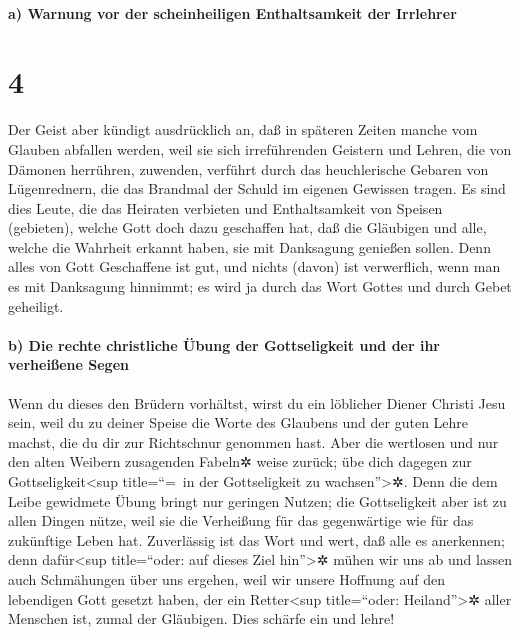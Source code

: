 \hypertarget{a-warnung-vor-der-scheinheiligen-enthaltsamkeit-der-irrlehrer}{%
\paragraph{a) Warnung vor der scheinheiligen Enthaltsamkeit der
Irrlehrer}\label{a-warnung-vor-der-scheinheiligen-enthaltsamkeit-der-irrlehrer}}

\hypertarget{section-3}{%
\section{4}\label{section-3}}

 Der Geist aber kündigt ausdrücklich an, daß in späteren
Zeiten manche vom Glauben abfallen werden, weil sie sich irreführenden
Geistern und Lehren, die von Dämonen herrühren, zuwenden, 
verführt durch das heuchlerische Gebaren von Lügenrednern, die das
Brandmal der Schuld im eigenen Gewissen tragen.  Es sind
dies Leute, die das Heiraten verbieten und Enthaltsamkeit von Speisen
(gebieten), welche Gott doch dazu geschaffen hat, daß die Gläubigen und
alle, welche die Wahrheit erkannt haben, sie mit Danksagung genießen
sollen.  Denn alles von Gott Geschaffene ist gut, und
nichts (davon) ist verwerflich, wenn man es mit Danksagung hinnimmt;
 es wird ja durch das Wort Gottes und durch Gebet
geheiligt.

\hypertarget{b-die-rechte-christliche-uxfcbung-der-gottseligkeit-und-der-ihr-verheiuxdfene-segen}{%
\paragraph{b) Die rechte christliche Übung der Gottseligkeit und der ihr
verheißene
Segen}\label{b-die-rechte-christliche-uxfcbung-der-gottseligkeit-und-der-ihr-verheiuxdfene-segen}}

 Wenn du dieses den Brüdern vorhältst, wirst du ein
löblicher Diener Christi Jesu sein, weil du zu deiner Speise die Worte
des Glaubens und der guten Lehre machst, die du dir zur Richtschnur
genommen hast.  Aber die wertlosen und nur den alten
Weibern zusagenden Fabeln✲ weise zurück; übe dich dagegen zur
Gottseligkeit\textless sup title=``=~in der Gottseligkeit zu
wachsen''\textgreater✲.  Denn die dem Leibe gewidmete
Übung bringt nur geringen Nutzen; die Gottseligkeit aber ist zu allen
Dingen nütze, weil sie die Verheißung für das gegenwärtige wie für das
zukünftige Leben hat.  Zuverlässig ist das Wort und wert,
daß alle es anerkennen;  denn dafür\textless sup
title=``oder: auf dieses Ziel hin''\textgreater✲ mühen wir uns ab und
lassen auch Schmähungen über uns ergehen, weil wir unsere Hoffnung auf
den lebendigen Gott gesetzt haben, der ein Retter\textless sup
title=``oder: Heiland''\textgreater✲ aller Menschen ist, zumal der
Gläubigen.  Dies schärfe ein und lehre!

